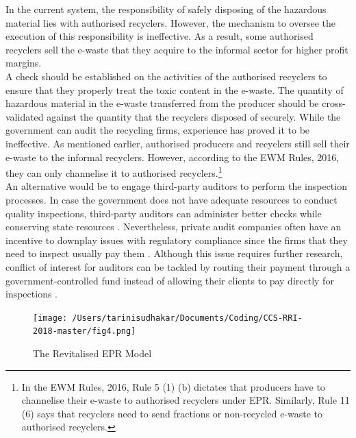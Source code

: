 \documentclass[a4paper, 12pt]{article}
\begin{document}
                    In the current system, the responsibility of safely disposing of the hazardous material lies with authorised recyclers. However, the mechanism to oversee the execution of this responsibility is ineffective. As a result, some authorised recyclers sell the e-waste that they acquire to the informal sector for higher profit margins.\\
                    
                    A check should be established on the activities of the authorised recyclers to ensure that they properly treat the toxic content in the e-waste. The quantity of hazardous material in the e-waste transferred from the producer should be cross-validated against the quantity that the recyclers disposed of securely. While the government can audit the recycling firms, experience has proved it to be ineffective. As mentioned earlier, authorised producers and recyclers still sell their e-waste to the informal recyclers. However, according to the EWM Rules, 2016, they can only channelise it to authorised recyclers.\footnote{In the EWM Rules, 2016, Rule 5 (1) (b) dictates that producers have to channelise their e-waste to authorised recyclers under EPR. Similarly, Rule 11 (6) says that recyclers need to send fractions or non-recycled e-waste to authorised recyclers.}\\
                    
                    An alternative would be to engage third-party auditors to perform the inspection processes. In case the government does not have adequate resources to conduct quality inspections, third-party auditors can administer better checks while conserving state resources \parencite{mcallisterreport}. Nevertheless, private audit companies often have an incentive to downplay issues with regulatory compliance since the firms that they need to inspect usually pay them \parencite{shorttoffelpaper}. Although this issue requires further research, conflict of interest for auditors can be tackled by routing their payment through a government-controlled fund instead of allowing their clients to pay directly for inspections \parencite{duflopaper}.\\

                     
                    \begin{figure}[H]
                    	\centering
                    	\texttt{[image: /Users/tarinisudhakar/Documents/Coding/CCS-RRI-2018-master/fig4.png]}
                    	\caption[Optional Caption]{The Revitalised EPR Model}
                    \end{figure}
                    
\end{document}
